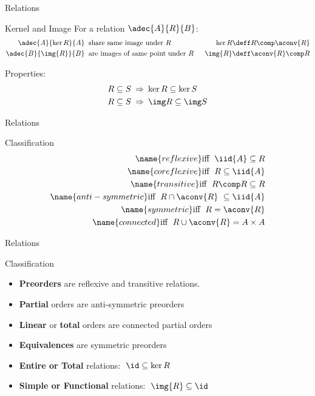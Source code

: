 \documentclass{beamer}
\def\imp{\mathbin{\Rightarrow}}
\begin{document}
\begin{slide}{Relations}

\begin{block}{Kernel and Image}
  For a relation $\adec{A}{R}{B}$:
\begin{align*}
\adec{A}{\ker R}{A} & \; \; \text{share same image under $R$}\; \; &
    \ker R \deff  R \comp \aconv{R} %
    \\
\adec{B}{\img{R}}{B} & \; \; \text{are images of same point under $R$}\; \; &
    \img{R} \deff \aconv{R} \comp R %
\end{align*}

\noindent
Properties:\\
\begin{align*}
R \subseteq S\;  & \imp\;  \ker R \subseteq \ker S %
\\
R \subseteq S\; &  \imp\;  \img R \subseteq \img S %
\end{align*}
\end{block}
\end{slide}


\begin{slide}{Relations}

\begin{block}{Classification}
\begin{eqnarray*}
  \name{reflexive}        \mbox{iff~}\; \iid{A} \subseteq R \\
  \name{coreflexive}      \mbox{iff~}\; R \subseteq \iid{A} \\
  \name{transitive}       \mbox{iff~}\; R \comp R \subseteq R \\
  \name{anti-symmetric}   \mbox{iff~}\; R \cap \aconv{R} \ \subseteq \iid{A} \\
  \name{symmetric}        \mbox{iff~}\; R = \aconv{R} \label{rel:sym} \\
  \name{connected}        \mbox{iff~}\; R \cup \aconv{R} = A \times A
   \label{rel:con}
\end{eqnarray*}
\end{block}
\end{slide}

\begin{slide}{Relations}

\begin{block}{Classification}
\begin{itemize}
\item  \textbf{Preorders} are reflexive and transitive relations.
\item  \textbf{Partial} orders are anti-symmetric preorders
\item \textbf{Linear} or \textbf{total} orders are connected partial orders
\item  \textbf{Equivalences} are symmetric preorders

\item \textbf{Entire or Total} relations: $\; \id \subseteq \ker{R}$
\item \textbf{Simple or Functional} relations: $\; \img{R} \subseteq \id$
\end{itemize}
\end{block}
\end{slide}
\end{document}
